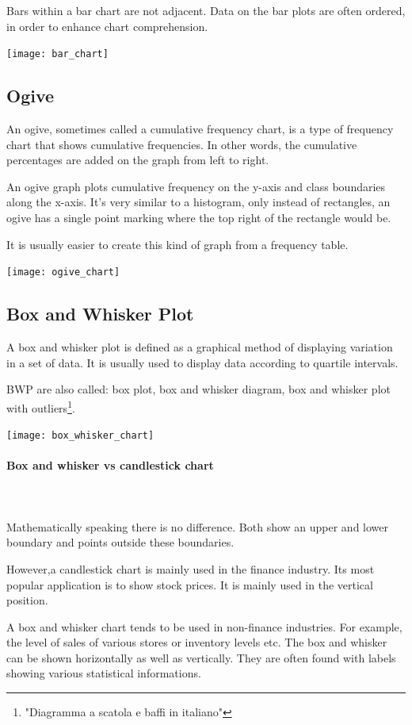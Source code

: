 \documentclass{article}
\begin{document}
Bars within a bar chart are not adjacent. Data on the bar plots are often ordered, in order to enhance chart comprehension. 

\texttt{[image: bar\_chart]}

\subsection{Ogive}
An ogive, sometimes called a cumulative frequency chart, is a type of frequency chart that shows cumulative frequencies. In other words, the cumulative percentages are added on the graph from left to right.

An ogive graph plots cumulative frequency on the y-axis and class boundaries along the x-axis. It’s very similar to a histogram, only instead of rectangles, an ogive has a single point marking where the top right of the rectangle would be. 

It is usually easier to create this kind of graph from a frequency table.

\texttt{[image: ogive\_chart]}

\subsection{Box and Whisker Plot}
A box and whisker plot is defined as a graphical method of displaying variation in a set of data. It is usually used to display data according to quartile intervals.

BWP are also called: box plot, box and whisker diagram, box and whisker plot with outliers\footnote{"Diagramma a scatola e baffi in italiano"}.

\texttt{[image: box\_whisker\_chart]}

\paragraph{Box and whisker vs candlestick chart}\mbox{} \\
\mbox{} \\
Mathematically speaking there is no difference. Both show an upper and lower boundary and points outside these boundaries. 

However,a candlestick chart is mainly used in the finance industry. Its most popular application is to show stock prices. It is mainly used in the vertical position.

A  box and whisker chart tends to be used in non-finance industries. For example, the level of sales of various stores or inventory levels etc. The box and whisker can be shown horizontally as well as vertically. They are often found with labels showing various statistical informations. 
\end{document}
